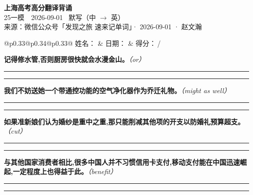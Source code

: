 \documentclass[11pt,a4paper]{article}
\newcommand{\num}[1]{\makebox[1.9em][r]{#1.}\hspace{0.3em}}
\newcommand{\wline}{\noindent\rule{\linewidth}{0.4pt}}
\newcommand{\prompt}[1]{\emph{\textcolor{tipblue}{\small（#1）}}}
\begin{document}
\pagestyle{plain}
\begin{center}
{\LARGE\bfseries 上海高考高分翻译背诵 }\\[0.25em]
{\large 25一模　2026-09-01 \quad\ 默写（中 $\to$ 英）}\\[0.35em]
{\footnotesize 来源：微信公众号「发现之旅 速来记单词」· 2026-09-01 · 赵文瀚}
\end{center}

\vspace{0.4em}
\noindent\begin{tabular}{@{}p{0.33\textwidth}@{}p{0.34\textwidth}@{}p{0.33\textwidth}@{}}
姓名：\underline{\hspace{2.0cm}} & 日期：\underline{\hspace{2.0cm}} & 得分：\underline{\hspace{1.4cm}}\,/ \\
\end{tabular}

\vspace{0.5em}

\vspace{0.8em}
\num{1}\textbf{记得修水管,否则厨房很快就会水漫金山。}\prompt{or}

\vspace{0.3em}

\wline\vspace{0.3em}
\wline

\num{2}\textbf{我们不妨送她一个带通控功能的空气净化器作为乔迁礼物。}\prompt{might as well}

\vspace{0.3em}

\wline\vspace{0.3em}
\wline

\num{3}\textbf{如果准新娘们认为婚纱是重中之重,那只能削减其他项的开支以防婚礼预算超支。}\prompt{cut}

\vspace{0.3em}

\wline\vspace{0.3em}
\wline

\num{4}\textbf{与其他国家消费者相比,很多中国人并不习惯信用卡支付,移动支付能在中国迅速崛起,一定程度上也得益于此。}\prompt{benefit}

\vspace{0.3em}

\wline\vspace{0.3em}
\wline
\end{document}
